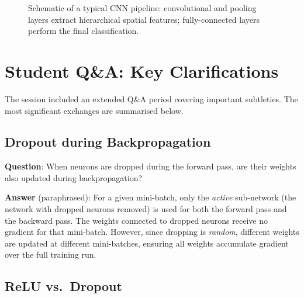 \documentclass[12pt,a4paper]{article}
\begin{document}
\begin{figure}[htbp]
  \caption{Schematic of a typical CNN pipeline: convolutional and pooling
           layers extract hierarchical spatial features; fully-connected
           layers perform the final classification.}
  \label{fig:cnn_pipeline}
\end{figure}

\section{Student Q\&A: Key Clarifications}
\label{sec:qa}

The session included an extended Q\&A period covering important subtleties.
The most significant exchanges are summarised below.

\subsection{Dropout during Backpropagation}
\label{sec:qa:dropout_backprop}

\textbf{Question}: When neurons are dropped during the forward pass, are
their weights also updated during backpropagation?

\textbf{Answer} (paraphrased): For a given mini-batch, only the
\emph{active} sub-network (the network with dropped neurons removed) is
used for both the forward pass and the backward pass.  The weights connected
to dropped neurons receive no gradient for that mini-batch.  However, since
dropping is \emph{random}, different weights are updated at different
mini-batches, ensuring all weights accumulate gradient over the full
training run.

\subsection{ReLU vs.\ Dropout}
\label{sec:qa:relu_vs_dropout}
\end{document}
